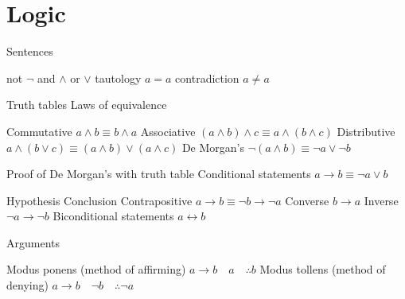 \section{Logic}
\begin{itemize}
\bulletitem Sentences
\begin{itemize}
\bulletitem not \( \neg \)
\bulletitem and \( \land \)
\bulletitem or \( \lor \)
\bulletitem tautology \( a = a \)
\bulletitem contradiction \( a \neq a \)
\end{itemize}
\bulletitem Truth tables
\bulletitem Laws of equivalence
\begin{itemize}
\bulletitem Commutative \( a \land b \equiv b \land a \)
\bulletitem Associative \( (a \land b) \land c \equiv a \land (b \land c) \)
\bulletitem Distributive \( a \land (b \lor c) \equiv (a \land b) \lor (a \land c) \)
\bulletitem De Morgan's \( \neg (a \land b) \equiv \neg a \lor \neg b \)
\end{itemize}
\bulletitem Proof of De Morgan's with truth table
\bulletitem Conditional statements \( a \rightarrow b \equiv \neg a \lor b \)
\begin{itemize}
\bulletitem Hypothesis
\bulletitem Conclusion
\bulletitem Contrapositive \( a \rightarrow b \equiv \neg b \rightarrow \neg a \)
\bulletitem Converse \( b \rightarrow a \)
\bulletitem Inverse \( \neg a \rightarrow \neg b \)
\bulletitem Biconditional statements \( a \leftrightarrow b \)
\end{itemize}
\bulletitem Arguments
\begin{itemize}
\bulletitem Modus ponens (method of affirming) \( a \rightarrow b \quad a \quad \therefore b \)
\bulletitem Modus tollens (method of denying) \( a \rightarrow b \quad \neg b \quad \therefore \neg a \)
\end{itemize}
\end{itemize}